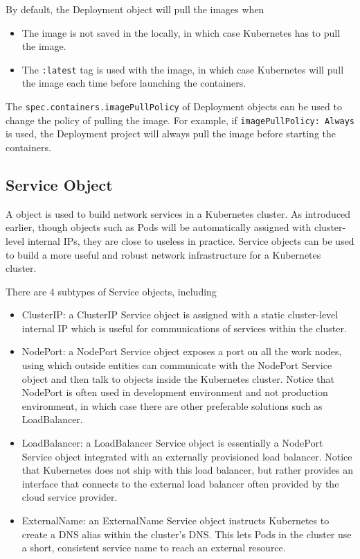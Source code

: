 By default, the Deployment object will pull the images when
\begin{itemize}
  \item The image is not saved in the locally, in which case Kubernetes has to pull the image.
  \item The \verb|:latest| tag is used with the image, in which case Kubernetes will pull the image each time before launching the containers.
\end{itemize}
The \texttt{spec.containers.imagePullPolicy} of Deployment objects can be used to change the policy of pulling the image. For example, if \texttt{imagePullPolicy: Always} is used, the Deployment project will always pull the image before starting the containers.

\subsection{Service Object} \label{ch:vac:subsec:k8snetworking}

A  object is used to build network services in a Kubernetes cluster. As introduced earlier, though objects such as Pods will be automatically assigned with cluster-level internal IPs, they are close to useless in practice. Service objects can be used to build a more useful and robust network infrastructure for a Kubernetes cluster.

There are 4 subtypes of Service objects, including
\begin{itemize}
	\item ClusterIP: a ClusterIP Service object is assigned with a static cluster-level internal IP which is useful for communications of services within the cluster.
	\item NodePort: a NodePort Service object exposes a port on all the work nodes, using which outside entities can communicate with the NodePort Service object and then talk to objects inside the Kubernetes cluster. Notice that NodePort is often used in development environment and not production environment, in which case there are other preferable solutions such as LoadBalancer.
	\item LoadBalancer: a LoadBalancer Service object is essentially a NodePort Service object integrated with an externally provisioned load balancer. Notice that Kubernetes does not ship with this load balancer, but rather provides an interface that connects to the external load balancer often provided by the cloud service provider.
	\item ExternalName: an ExternalName Service object instructs Kubernetes to create a DNS alias within the cluster’s DNS. This lets Pods in the cluster use a short, consistent service name to reach an external resource.
\end{itemize}

